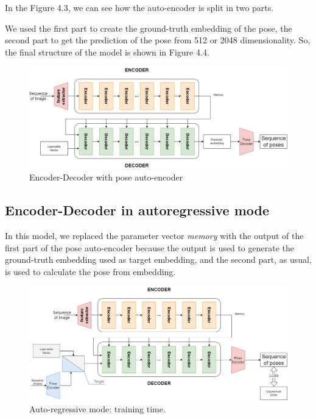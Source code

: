 In the Figure 4.3, we can see how the auto-encoder is split in two parts.

We used the first part to create the ground-truth embedding of the pose, the second part to get the prediction of the pose from 512 or 2048 dimensionality.
So, the final structure of the model is shown in Figure 4.4.
\begin{figure}[H]
    \centering
    \includegraphics[width=\textwidth]{images/4_1_encoder_decoder_with_pose_autoencoder}
    \caption{Encoder-Decoder with pose auto-encoder}\label{fig:figure-encoder-decoder-with-pose-encoder}
\end{figure}

\subsection{Encoder-Decoder in autoregressive mode}\label{subsec:encoder-decoder-in-autoregressive-mode}
In this model, we replaced the parameter vector \textit{memory} with the output of the first part of the pose auto-encoder because the output is used to generate the ground-truth embedding used as target embedding, and the second part, as usual, is used to calculate the pose from embedding.

\begin{figure}[H]
    \centering
    \includegraphics[width=\textwidth]{images/4_1_ar_train}
    \caption{Auto-regressive mode: training time.}\label{fig:figure-auto-regressive-train}
\end{figure}

